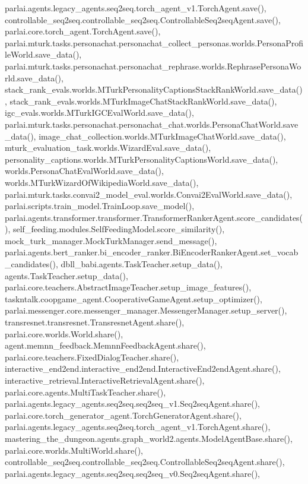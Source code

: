 parlai.\+agents.\+legacy\+\_\+agents.\+seq2seq.\+torch\+\_\+agent\+\_\+v1.\+Torch\+Agent.\+save(), controllable\+\_\+seq2seq.\+controllable\+\_\+seq2seq.\+Controllable\+Seq2seq\+Agent.\+save(), parlai.\+core.\+torch\+\_\+agent.\+Torch\+Agent.\+save(), parlai.\+mturk.\+tasks.\+personachat.\+personachat\+\_\+collect\+\_\+personas.\+worlds.\+Persona\+Profile\+World.\+save\+\_\+data(), parlai.\+mturk.\+tasks.\+personachat.\+personachat\+\_\+rephrase.\+worlds.\+Rephrase\+Persona\+World.\+save\+\_\+data(), stack\+\_\+rank\+\_\+evals.\+worlds.\+M\+Turk\+Personality\+Captions\+Stack\+Rank\+World.\+save\+\_\+data(), stack\+\_\+rank\+\_\+evals.\+worlds.\+M\+Turk\+Image\+Chat\+Stack\+Rank\+World.\+save\+\_\+data(), igc\+\_\+evals.\+worlds.\+M\+Turk\+I\+G\+C\+Eval\+World.\+save\+\_\+data(), parlai.\+mturk.\+tasks.\+personachat.\+personachat\+\_\+chat.\+worlds.\+Persona\+Chat\+World.\+save\+\_\+data(), image\+\_\+chat\+\_\+collection.\+worlds.\+M\+Turk\+Image\+Chat\+World.\+save\+\_\+data(), mturk\+\_\+evaluation\+\_\+task.\+worlds.\+Wizard\+Eval.\+save\+\_\+data(), personality\+\_\+captions.\+worlds.\+M\+Turk\+Personality\+Captions\+World.\+save\+\_\+data(), worlds.\+Persona\+Chat\+Eval\+World.\+save\+\_\+data(), worlds.\+M\+Turk\+Wizard\+Of\+Wikipedia\+World.\+save\+\_\+data(), parlai.\+mturk.\+tasks.\+convai2\+\_\+model\+\_\+eval.\+worlds.\+Convai2\+Eval\+World.\+save\+\_\+data(), parlai.\+scripts.\+train\+\_\+model.\+Train\+Loop.\+save\+\_\+model(), parlai.\+agents.\+transformer.\+transformer.\+Transformer\+Ranker\+Agent.\+score\+\_\+candidates(), self\+\_\+feeding.\+modules.\+Self\+Feeding\+Model.\+score\+\_\+similarity(), mock\+\_\+turk\+\_\+manager.\+Mock\+Turk\+Manager.\+send\+\_\+message(), parlai.\+agents.\+bert\+\_\+ranker.\+bi\+\_\+encoder\+\_\+ranker.\+Bi\+Encoder\+Ranker\+Agent.\+set\+\_\+vocab\+\_\+candidates(), dbll\+\_\+babi.\+agents.\+Task\+Teacher.\+setup\+\_\+data(), agents.\+Task\+Teacher.\+setup\+\_\+data(), parlai.\+core.\+teachers.\+Abstract\+Image\+Teacher.\+setup\+\_\+image\+\_\+features(), taskntalk.\+coopgame\+\_\+agent.\+Cooperative\+Game\+Agent.\+setup\+\_\+optimizer(), parlai.\+messenger.\+core.\+messenger\+\_\+manager.\+Messenger\+Manager.\+setup\+\_\+server(), transresnet.\+transresnet.\+Transresnet\+Agent.\+share(), parlai.\+core.\+worlds.\+World.\+share(), agent.\+memnn\+\_\+feedback.\+Memnn\+Feedback\+Agent.\+share(), parlai.\+core.\+teachers.\+Fixed\+Dialog\+Teacher.\+share(), interactive\+\_\+end2end.\+interactive\+\_\+end2end.\+Interactive\+End2end\+Agent.\+share(), interactive\+\_\+retrieval.\+Interactive\+Retrieval\+Agent.\+share(), parlai.\+core.\+agents.\+Multi\+Task\+Teacher.\+share(), parlai.\+agents.\+legacy\+\_\+agents.\+seq2seq.\+seq2seq\+\_\+v1.\+Seq2seq\+Agent.\+share(), parlai.\+core.\+torch\+\_\+generator\+\_\+agent.\+Torch\+Generator\+Agent.\+share(), parlai.\+agents.\+legacy\+\_\+agents.\+seq2seq.\+torch\+\_\+agent\+\_\+v1.\+Torch\+Agent.\+share(), mastering\+\_\+the\+\_\+dungeon.\+agents.\+graph\+\_\+world2.\+agents.\+Model\+Agent\+Base.\+share(), parlai.\+core.\+worlds.\+Multi\+World.\+share(), controllable\+\_\+seq2seq.\+controllable\+\_\+seq2seq.\+Controllable\+Seq2seq\+Agent.\+share(), parlai.\+agents.\+legacy\+\_\+agents.\+seq2seq.\+seq2seq\+\_\+v0.\+Seq2seq\+Agent.\+share(), 